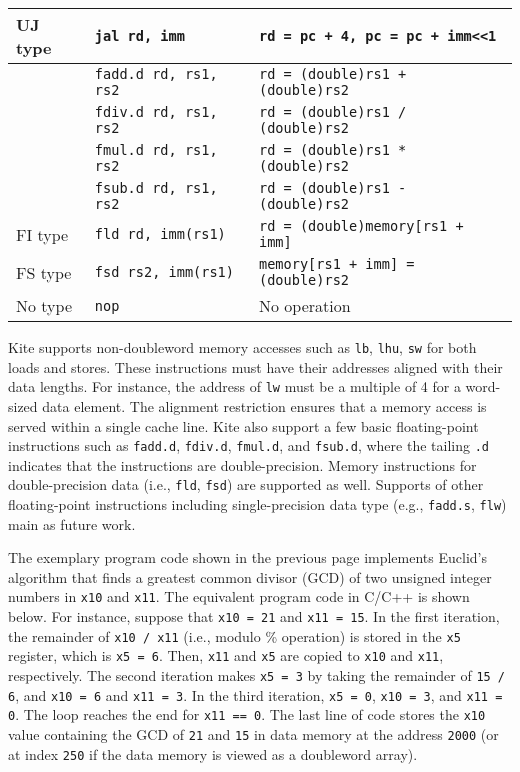 \documentclass[10pt]{article}
\begin{document}
\begin{longtable}{>{\centering\arraybackslash} m{0.60in}|
                  >{\centering\arraybackslash} m{1.65in}|
                  >{\centering\arraybackslash} m{3.70in}
                 }
    UJ type             & {\tt jal  rd, imm}        & {\tt rd = pc + 4, pc = pc + imm<<1} \\ \hline
\multirow{4}{*}{FR type}& {\tt fadd.d  rd, rs1, rs2}& {\tt rd = (double)rs1 + (double)rs2}  \\
                        & {\tt fdiv.d  rd, rs1, rs2}& {\tt rd = (double)rs1 / (double)rs2}  \\
                        & {\tt fmul.d  rd, rs1, rs2}& {\tt rd = (double)rs1 * (double)rs2}  \\
                        & {\tt fsub.d  rd, rs1, rs2}& {\tt rd = (double)rs1 - (double)rs2}  \\ \hline
FI type                 & {\tt fld  rd, imm(rs1)}   & {\tt rd = (double)memory[rs1 + imm]} \\ \hline
FS type                 & {\tt fsd  rs2, imm(rs1)}  & {\tt memory[rs1 + imm] = (double)rs2}\\ \hline
No type                 & {\tt nop}                 & No operation          \\ \hline
\end{longtable}

Kite supports non-doubleword memory accesses such as {\tt lb}, {\tt lhu}, {\tt sw} for both loads and stores.
These instructions must have their addresses aligned with their data lengths.
For instance, the address of {\tt lw} must be a multiple of 4 for a word-sized data element.
The alignment restriction ensures that a memory access is served within a single cache line.
Kite also support a few basic floating-point instructions such as {\tt fadd.d}, {\tt fdiv.d}, {\tt fmul.d}, and {\tt fsub.d}, where the tailing {\tt .d} indicates that the instructions are double-precision.
Memory instructions for double-precision data (i.e., {\tt fld}, {\tt fsd}) are supported as well.
Supports of other floating-point instructions including single-precision data type (e.g., {\tt fadd.s}, {\tt flw}) main as future work.

The exemplary program code shown in the previous page implements Euclid's algorithm that finds a greatest common divisor (GCD) of two unsigned integer numbers in {\tt x10} and {\tt x11}.
The equivalent program code in C/C++ is shown below.
For instance, suppose that {\tt x10 = 21} and {\tt x11 = 15}.
In the first iteration, the remainder of {\tt x10 / x11} (i.e., modulo \% operation) is stored in the {\tt x5} register, which is {\tt x5 = 6}.
Then, {\tt x11} and {\tt x5} are copied to {\tt x10} and {\tt x11}, respectively.
The second iteration makes {\tt x5 = 3} by taking the remainder of {\tt 15 / 6}, and {\tt x10 = 6} and {\tt x11 = 3}.
In the third iteration, {\tt x5 = 0}, {\tt x10 = 3}, and {\tt x11 = 0}.
The loop reaches the end for {\tt x11 == 0}.
The last line of code stores the {\tt x10} value containing the GCD of {\tt 21} and {\tt 15} in data memory at the address {\tt 2000} (or at index {\tt 250} if the data memory is viewed as a doubleword array).
\end{document}
